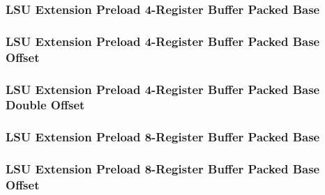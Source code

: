 \subsubsection[{\small LSU Extension Preload 4-Register Buffer Packed Base}]{LSU Extension Preload 4-Register Buffer Packed Base} \label{sec:format-LSU-XPL4RBB}



\subsubsection[{\small LSU Extension Preload 4-Register Buffer Packed Base Offset}]{LSU Extension Preload 4-Register Buffer Packed Base Offset} \label{sec:format-LSU-XPL4RBB.O}



\subsubsection[{\small LSU Extension Preload 4-Register Buffer Packed Base Double Offset}]{LSU Extension Preload 4-Register Buffer Packed Base Double Offset} \label{sec:format-LSU-XPL4RBB.D}



\subsubsection[{\small LSU Extension Preload 8-Register Buffer Packed Base}]{LSU Extension Preload 8-Register Buffer Packed Base} \label{sec:format-LSU-XPL8RBB}



\subsubsection[{\small LSU Extension Preload 8-Register Buffer Packed Base Offset}]{LSU Extension Preload 8-Register Buffer Packed Base Offset} \label{sec:format-LSU-XPL8RBB.O}



